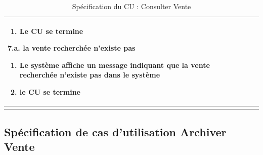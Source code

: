 \begin{longtable}{|>{\bfseries\raggedright\arraybackslash}p{3.5cm}|p{\dimexpr\textwidth-3.5cm-4\tabcolsep-2\arrayrulewidth}|}
\begin{enumerate}[leftmargin=1.5em, topsep=2pt, itemsep=1pt]
  \item Le CU se termine
\end{enumerate}
\textbf{7.a. la vente recherchée n'existe pas}
\begin{enumerate}[leftmargin=1.5em, topsep=2pt, itemsep=1pt]
  \item Le système affiche un message indiquant que la vente recherchée n'existe pas dans le système
  \item le CU se termine
\end{enumerate} \\
\hline
\caption{Spécification du CU : Consulter Vente}
\label{tab:cu-consulter-vente}
\end{longtable}

\newpage
{}
\subsection{Spécification de cas d'utilisation Archiver Vente}

